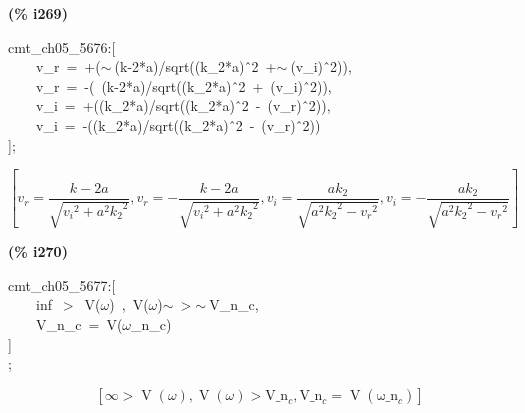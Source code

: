 \documentclass[fleqn]{article}
\begin{document}
\noindent
\begin{minipage}[t]{4.000000em}\color{red}\bfseries
(\% i269)	
\end{minipage}
\begin{minipage}[t]{\textwidth}\color{blue}
cmt\_ch05\_5676:[\\
\ \ \ \ v\_r\ =\ +(\ensuremath{\sim\ }(k-2*a)/sqrt((k\_2*a)\^\ 2\ +\ensuremath{\sim\ }(v\_i)\^\ 2)),\\
\ \ \ \ v\_r\ =\ -(\ (k-2*a)/sqrt((k\_2*a)\^\ 2\ +\ (v\_i)\^\ 2)),\\
\ \ \ \ v\_i\ =\ +((k\_2*a)/sqrt((k\_2*a)\^\ 2\ -\ (v\_r)\^\ 2)),\\
\ \ \ \ v\_i\ =\ -((k\_2*a)/sqrt((k\_2*a)\^\ 2\ -\ (v\_r)\^\ 2))\\
];
\end{minipage}
\[\displaystyle \tag{\% o269} 
\operatorname{[}{v_r}=\frac{k-2 a}{\sqrt{{{{v_i}}^{2}}+{{a}^{2}} {{{k_2}}^{2}}}}\operatorname{,}{v_r}=-\frac{k-2 a}{\sqrt{{{{v_i}}^{2}}+{{a}^{2}} {{{k_2}}^{2}}}}\operatorname{,}{v_i}=\frac{a {k_2}}{\sqrt{{{a}^{2}} {{{k_2}}^{2}}-{{{v_r}}^{2}}}}\operatorname{,}{v_i}=-\frac{a {k_2}}{\sqrt{{{a}^{2}} {{{k_2}}^{2}}-{{{v_r}}^{2}}}}\operatorname{]}\mbox{}
\]


\noindent
\begin{minipage}[t]{4.000000em}\color{red}\bfseries
(\% i270)	
\end{minipage}
\begin{minipage}[t]{\textwidth}\color{blue}
cmt\_ch05\_5677:[\\
\ \ \ \ inf\ \ensuremath{>}\ V(\ensuremath{\omega})\ ,\ V(\ensuremath{\omega})\ensuremath{\sim\ }\ensuremath{>}\ensuremath{\sim\ }V\_n\_c,\\
\ \ \ \ V\_n\_c\ =\ V(\ensuremath{\omega}\_n\_c)\\
]\\
;
\end{minipage}
\[\displaystyle \tag{\% o270} 
\left[ \infty \operatorname{>  }\operatorname{V}\left( \omega \right) \operatorname{,}\operatorname{V}\left( \omega \right) \operatorname{>  }{{\ensuremath{\mathrm{V\_ n}}}_c}\operatorname{,}{{\ensuremath{\mathrm{V\_ n}}}_c}=\operatorname{V}\left( {{\ensuremath{\mathrm{\omega \_ n}}}_c}\right) \right] \mbox{}
\]
\end{document}
